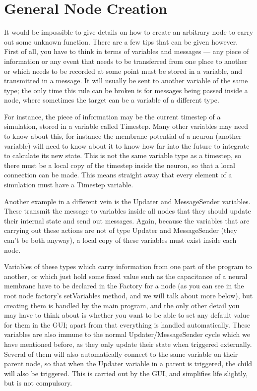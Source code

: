 \documentclass[pdftex,a4paper]{article}
\begin{document}
\section{General Node Creation}

It would be impossible to give details on how to create an arbitrary
node to carry out some unknown function. There are a few tips that can
be given however. First of all, you have to think in terms of
variables and messages --- any piece of information or any event that
needs to be transferred from one place to another or which needs to be
recorded at some point must be stored in a variable, and transmitted
in a message.  It will usually be sent to another variable of the same
type; the only time this rule can be broken is for messages being
passed inside a node, where sometimes the target can be a variable of
a different type.

For instance, the piece of information may be the current timestep of
a simulation, stored in a variable called Timestep. Many other
variables may need to know about this, for instance the membrane
potential of a neuron (another variable) will need to know about it to
know how far into the future to integrate to calculate its new
state. This is not the same variable type as a timestep, so there must
be a local copy of the timestep inside the neuron, so that a local
connection can be made. This means straight away that every element of
a simulation must have a Timestep variable.

Another example in a different vein is the Updater and MessageSender
variables. These transmit the message to variables inside all nodes
that they should update their internal state and send out
messages. Again, because the variables that are carrying out these
actions are not of type Updater and MessageSender (they can't be both
anyway), a local copy of these variables must exist inside each node.

Variables of these types which carry information from one part of the
program to another, or which just hold some fixed value such as the
capacitance of a neural membrane have to be declared in the Factory
for a node (as you can see in the root node factory's setVariables
method, and we will talk about more below), but creating them is
handled by the main program, and the only other detail you may have to
think about is whether you want to be able to set any default value
for them in the GUI; apart from that everything is handled
automatically. These variables are also immune to the normal
Updater/MessageSender cycle which we have mentioned before, as they
only update their state when triggered externally. Several of them
will also automatically connect to the same variable on their parent
node, so that when the Updater variable in a parent is triggered, the
child will also be triggered. This is carried out by the GUI, and
simplifies life slightly, but is not compulsory.
\end{document}
